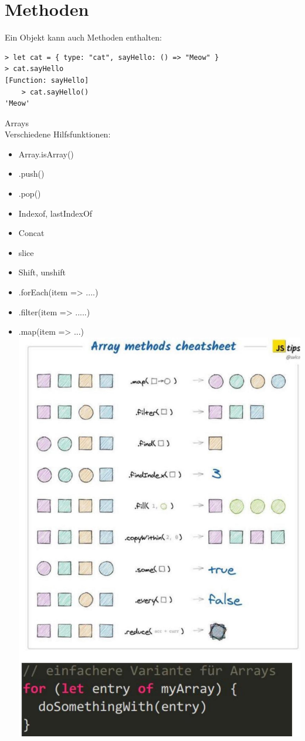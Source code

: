 \documentclass[10pt]{article}
\begin{document}
\section*{Methoden}
Ein Objekt kann auch Methoden enthalten:

\begin{verbatim}
> let cat = { type: "cat", sayHello: () => "Meow" }
> cat.sayHello
[Function: sayHello]
    > cat.sayHello()
'Meow'
\end{verbatim}

Arrays\\
Verschiedene Hilfsfunktionen:

\begin{itemize}
  \item Array.isArray()
  \item .push()
  \item .pop()
  \item Indexof, lastIndexOf
  \item Concat
  \item slice
  \item Shift, unshift
  \item .forEach(item => ....)
  \item .filter(item => .....)
  \item .map(item => ...)\\
\includegraphics[max width=\textwidth, center]{2024_12_29_858f09cde51177c71657g-08}
\end{itemize}
\end{document}
